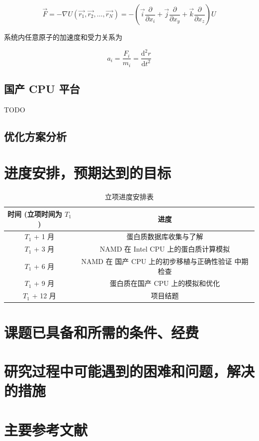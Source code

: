 \begin{equation}
    \vec{F} = -\nabla U (\vec{r_1}, \vec{r_2}, \dots, \vec{r_N}) = - \left( \vec{i} \frac{\partial}{\partial x_i} + \vec{j}\frac{\partial}{\partial x_y} + \vec{k} \frac{\partial}{\partial x_z}\right) U
\end{equation}

系统内任意原子的加速度和受力关系为\cite{易浩杰2019纳米静电喷射的分子动力学模拟研究}

\begin{equation}
    a_i = \frac{F_i}{m_i} = \frac{\mathrm{d}^2 r}{\mathrm{d} t^2}
\end{equation}

\subsection{国产 CPU 平台}

TODO

\subsection{优化方案分析}

\section{进度安排，预期达到的目标}

\begin{table}[h]
    \centering
    \caption{立项进度安排表}
    \begin{tabular}{cc}
        \toprule
        时间 (立项时间为 $T_1$) & 进度                              \\
        \midrule
        $T_1$ + 1 月      & 蛋白质数据库收集与了解                     \\
        $T_1$ + 3 月      & NAMD 在 Intel CPU 上的蛋白质计算模拟      \\
        $T_1$ + 6 月      & NAMD 在 国产 CPU 上的初步移植与正确性验证 中期检查 \\
        $T_1$ + 9 月      & 蛋白质在国产 CPU 上的模拟和优化              \\
        $T_1$ + 12 月     & 项目结题                            \\
        \bottomrule
    \end{tabular}
\end{table}
\section{课题已具备和所需的条件、经费}
\section{研究过程中可能遇到的困难和问题，解决的措施}
\section{主要参考文献}



